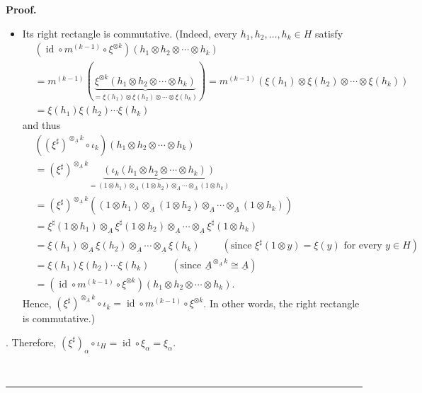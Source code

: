 \documentclass[numbers=enddot,12pt,final,onecolumn,notitlepage,abstracton]{scrartcl}%
\theoremstyle{definition}
\newenvironment{proof}[1][Proof]{\noindent\textbf{#1.} }{\ \rule{0.5em}{0.5em}}
\begin{document}
\begin{proof}
{\begin{itemize}
\par
\item Its right rectangle is commutative. (Indeed, every $h_{1},h_{2}%
,\ldots,h_{k}\in H$ satisfy%
\begin{align*}
&  \left(  \operatorname*{id}\circ m^{\left(  k-1\right)  }\circ\xi^{\otimes
k}\right)  \left(  h_{1}\otimes h_{2}\otimes\cdots\otimes h_{k}\right) \\
&  =m^{\left(  k-1\right)  }\left(  \underbrace{\xi^{\otimes k}\left(
h_{1}\otimes h_{2}\otimes\cdots\otimes h_{k}\right)  }_{=\xi\left(
h_{1}\right)  \otimes\xi\left(  h_{2}\right)  \otimes\cdots\otimes\xi\left(
h_{k}\right)  }\right)  =m^{\left(  k-1\right)  }\left(  \xi\left(
h_{1}\right)  \otimes\xi\left(  h_{2}\right)  \otimes\cdots\otimes\xi\left(
h_{k}\right)  \right) \\
&  =\xi\left(  h_{1}\right)  \xi\left(  h_{2}\right)  \cdots\xi\left(
h_{k}\right)
\end{align*}
and thus%
\begin{align*}
&  \left(  \left(  \xi^{\sharp}\right)  ^{\otimes_{\underline{A}}k}\circ
\iota_{k}\right)  \left(  h_{1}\otimes h_{2}\otimes\cdots\otimes h_{k}\right)
\\
&  =\left(  \xi^{\sharp}\right)  ^{\otimes_{\underline{A}}k}%
\underbrace{\left(  \iota_{k}\left(  h_{1}\otimes h_{2}\otimes\cdots\otimes
h_{k}\right)  \right)  }_{=\left(  1\otimes h_{1}\right)  \otimes
_{\underline{A}}\left(  1\otimes h_{2}\right)  \otimes_{\underline{A}}%
\cdots\otimes_{\underline{A}}\left(  1\otimes h_{k}\right)  }\\
&  =\left(  \xi^{\sharp}\right)  ^{\otimes_{\underline{A}}k}\left(  \left(
1\otimes h_{1}\right)  \otimes_{\underline{A}}\left(  1\otimes h_{2}\right)
\otimes_{\underline{A}}\cdots\otimes_{\underline{A}}\left(  1\otimes
h_{k}\right)  \right) \\
&  =\xi^{\sharp}\left(  1\otimes h_{1}\right)  \otimes_{\underline{A}}%
\xi^{\sharp}\left(  1\otimes h_{2}\right)  \otimes_{\underline{A}}%
\cdots\otimes_{\underline{A}}\xi^{\sharp}\left(  1\otimes h_{k}\right) \\
&  =\xi\left(  h_{1}\right)  \otimes_{\underline{A}}\xi\left(  h_{2}\right)
\otimes_{\underline{A}}\cdots\otimes_{\underline{A}}\xi\left(  h_{k}\right)
\ \ \ \ \ \ \ \ \ \ \left(  \text{since }\xi^{\sharp}\left(  1\otimes
y\right)  =\xi\left(  y\right)  \text{ for every }y\in H\right) \\
&  =\xi\left(  h_{1}\right)  \xi\left(  h_{2}\right)  \cdots\xi\left(
h_{k}\right)  \ \ \ \ \ \ \ \ \ \ \left(  \text{since }\underline{A}%
^{\otimes_{\underline{A}}k}\cong\underline{A}\right) \\
&  =\left(  \operatorname*{id}\circ m^{\left(  k-1\right)  }\circ\xi^{\otimes
k}\right)  \left(  h_{1}\otimes h_{2}\otimes\cdots\otimes h_{k}\right)  .
\end{align*}
Hence, $\left(  \xi^{\sharp}\right)  ^{\otimes_{\underline{A}}k}\circ\iota
_{k}=\operatorname*{id}\circ m^{\left(  k-1\right)  }\circ\xi^{\otimes k}$. In
other words, the right rectangle is commutative.)
\end{itemize}
}. Therefore, $\left(  \xi^{\sharp}\right)  _{\alpha}\circ\iota_{H}%
=\operatorname*{id}\circ\xi_{\alpha}=\xi_{\alpha}$.


\end{proof}
\end{document}
